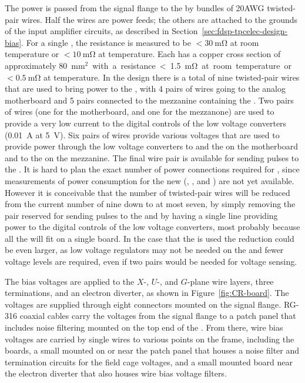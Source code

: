 The  power is passed from the signal flange to the 
 by bundles of \num{20}AWG twisted-pair wires. Half 
the wires are power feeds; the others are attached to the grounds 
of the input amplifier circuits, as described in 
Section~\ref{sec:fdsp-tpcelec-design-bias}.
For a single , the resistance is measured to be 
$<\SI{30}{\milli\ohm}$ at room temperature or $<\SI{10}{\milli\ohm}$ 
at  temperature. Each  has a copper 
cross section of approximately \SI{80}{mm$^2$} with a 
resistance <\SI{1.5}{\milli\ohm} at room temperature or 
$<\SI{0.5}{\milli\ohm}$ at  temperature.
In the  design there is a total of nine 
twisted-pair wires that are used to bring power to the
, with 4 pairs of wires going to the analog
motherboard and 5 pairs connected to the mezzanine containing
the . Two pairs of wires (one for the motherboard,
and one for the mezzanone) are used to provide a very low
current to the digital controls of the low voltage converters 
(\SI{0.01}{A} at \SI{5}{V}). Six pairs of wires provide 
various voltages that are used to provide power through the
low voltage converters to  and the 
on the motherboard and to the  on the mezzanine.
The final wire pair is available for sending pulses to the
. It is hard to plan the exact number of 
power connections required for , since measurements 
of power consumption for the new  (, 
, and ) are not yet available.
However it is conceivable that the number of twisted-pair
wires will be reduced from the current number of nine 
down to at most seven, by simply removing the pair
reserved for sending pulses to the  and by
having a single line providing power to the digital 
controls of the low voltage converters, most probably
because all the  will fit on a single board.
In the case that the  is used the reduction
could be even larger, as low voltage regulators may not
be needed on the  and fewer voltage levels
are required, even if two pairs would be needed for voltage sensing.

The bias voltages are applied to the $X$-, $U$-, and $G$-plane 
wire layers, three  terminations, and an electron diverter, 
as shown in Figure~\ref{fig:CR-board}. The voltages are supplied 
through eight  connectors mounted on the signal flange. 
RG-316 coaxial cables carry the voltages from the signal flange to 
a patch panel  that includes noise filtering mounted on the top 
end of the . From there, wire bias voltages are carried by single wires to 
various points on the  frame, including the  
boards, a small  mounted on or near the patch panel that 
houses a noise filter and termination circuits for the field cage 
voltages, and a small mounted board near the electron diverter 
that also houses wire bias voltage filters.

